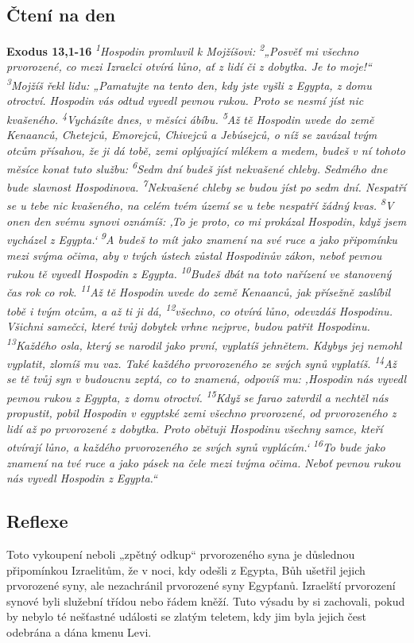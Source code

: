 \documentclass[11pt]{article}
\begin{document}
\subsection*{Čtení na den}
\textbf{Exodus 13,1-16}
\newline
\textit{
\textsuperscript{1}Hospodin promluvil k Mojžíšovi:
\textsuperscript{2}„Posvěť mi všechno prvorozené, co mezi Izraelci otvírá lůno, ať z lidí či z dobytka. Je to moje!“
\textsuperscript{3}Mojžíš řekl lidu: „Pamatujte na tento den, kdy jste vyšli z Egypta, z domu otroctví. Hospodin vás odtud vyvedl pevnou rukou. Proto se nesmí jíst nic kvašeného.
\textsuperscript{4}Vycházíte dnes, v měsíci ábíbu.
\textsuperscript{5}Až tě Hospodin uvede do země Kenaanců, Chetejců, Emorejců, Chivejců a Jebúsejců, o níž se zavázal tvým otcům přísahou, že ji dá tobě, zemi oplývající mlékem a medem, budeš v ní tohoto měsíce konat tuto službu:
\textsuperscript{6}Sedm dní budeš jíst nekvašené chleby. Sedmého dne bude slavnost Hospodinova.
\textsuperscript{7}Nekvašené chleby se budou jíst po sedm dní. Nespatří se u tebe nic kvašeného, na celém tvém území se u tebe nespatří žádný kvas.
\textsuperscript{8}V onen den svému synovi oznámíš: ‚To je proto, co mi prokázal Hospodin, když jsem vycházel z Egypta.‘
\textsuperscript{9}A budeš to mít jako znamení na své ruce a jako připomínku mezi svýma očima, aby v tvých ústech zůstal Hospodinův zákon, neboť pevnou rukou tě vyvedl Hospodin z Egypta.
\textsuperscript{10}Budeš dbát na toto nařízení ve stanovený čas rok co rok.
\textsuperscript{11}Až tě Hospodin uvede do země Kenaanců, jak přísežně zaslíbil tobě i tvým otcům, a až ti ji dá,
\textsuperscript{12}všechno, co otvírá lůno, odevzdáš Hospodinu. Všichni samečci, které tvůj dobytek vrhne nejprve, budou patřit Hospodinu.
\textsuperscript{13}Každého osla, který se narodil jako první, vyplatíš jehnětem. Kdybys jej nemohl vyplatit, zlomíš mu vaz. Také každého prvorozeného ze svých synů vyplatíš.
\textsuperscript{14}Až se tě tvůj syn v budoucnu zeptá, co to znamená, odpovíš mu: ‚Hospodin nás vyvedl pevnou rukou z Egypta, z domu otroctví.
\textsuperscript{15}Když se farao zatvrdil a nechtěl nás propustit, pobil Hospodin v egyptské zemi všechno prvorozené, od prvorozeného z lidí až po prvorozené z dobytka. Proto obětuji Hospodinu všechny samce, kteří otvírají lůno, a každého prvorozeného ze svých synů vyplácím.‘
\textsuperscript{16}To bude jako znamení na tvé ruce a jako pásek na čele mezi tvýma očima. Neboť pevnou rukou nás vyvedl Hospodin z Egypta.“
}

\subsection*{Reflexe}
Toto vykoupení neboli „zpětný odkup“ prvorozeného syna je důslednou připomínkou Izraelitům, že v noci, kdy odešli z Egypta,
Bůh ušetřil jejich prvorozené syny, ale nezachránil prvorozené syny Egypťanů. Izraelští prvorození synové byli služební třídou
nebo řádem kněží. Tuto výsadu by si zachovali, pokud by nebylo té nešťastné události se zlatým teletem, kdy jim byla jejich čest
odebrána a dána kmenu Levi.
\end{document}
